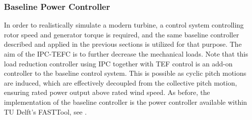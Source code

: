 %
\subsubsection*{Baseline Power Controller} %
In order to realistically simulate a modern turbine, a control system controlling rotor speed and generator torque is required, and the same baseline controller described and applied in the previous sections is utilized for that purpose. The aim of the IPC-TEFC is to further decrease the mechanical loads. Note that this load reduction controller using IPC together with TEF control is an add-on controller to the baseline control system. This is possible as cyclic pitch motions are induced, which are effectively decoupled from the collective pitch motion, ensuring rated power output above rated wind speed. As before, the implementation of the baseline controller is the power controller available within TU Delft's FASTTool, see \cite{mulders2020wind}. 
%
